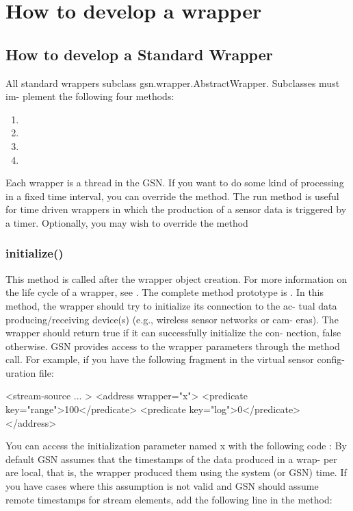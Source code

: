 \graphicspath{{chapters/ch-developer-guide/figures/}}

\section{How to develop a wrapper}

\subsection{How to develop a Standard Wrapper  \label{sec:developer-guide_wrappers}}

All standard wrappers subclass gsn.wrapper.AbstractWrapper. Subclasses must im-
plement the following four methods:
\begin{enumerate}
	\item {}
	\item {}
	\item {}
	\item {}
\end {enumerate}

Each wrapper is a thread in the GSN. If you want to do some kind of processing
in a fixed time interval, you can override the  method. The run method
is useful for time driven wrappers in which the production of a sensor data is
triggered by a timer.
Optionally, you may wish to override the method

\subsubsection {initialize()}
This method is called after the wrapper object creation. For more information
on the life cycle of a wrapper, see . The complete method
prototype is .
In this method, the wrapper should try to initialize its connection to the ac-
tual data producing/receiving device(s) (e.g., wireless sensor networks or cam-
eras). The wrapper should return true if it can successfully initialize the con-
nection, false otherwise.
GSN provides access to the wrapper parameters through the
method call.
For example, if you have the following fragment in the virtual sensor config-
uration file:
\begin{xmlcode}
	<stream-source ... >
	<address wrapper="x">
		<predicate key="range">100</predicate>
		<predicate key="log">0</predicate>
	</address>
\end{xmlcode}
You can access the initialization parameter named x with the following code :
By default GSN assumes that the timestamps of the data produced in a wrap-
per are local, that is, the wrapper produced them using the system (or GSN)
time. If you have cases where this assumption is not valid and GSN should
assume remote timestamps for stream elements, add the following line in the
 method:
